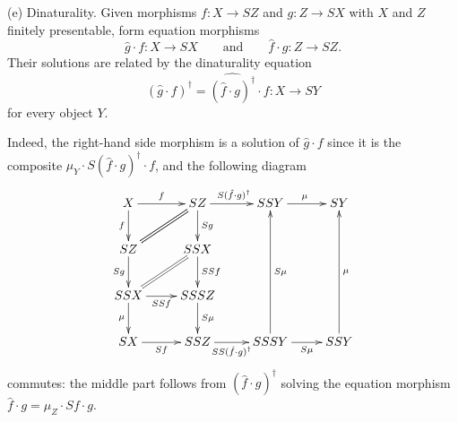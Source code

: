\documentclass{LMCS}
\theoremstyle{plain}
\theoremstyle{definition}
\numberwithin{equation}{section}
\begin{document}
\begin{exa}
\begin{enumerate}[label=\({\alph*}]
(e) Dinaturality.
Given morphisms $f:X\to SZ$ and $g:Z\to SX$ with $X$ and $Z$ finitely presentable, 
form equation morphisms
$$\hat g\cdot f:X\to SX\qquad\text{and}\qquad\hat f\cdot g:Z\to SZ.$$
Their solutions are related by the dinaturality equation
$$(\hat g\cdot f)^\dag=\widehat{(\hat f\cdot g)^\dag}\cdot f:X\to SY$$
for every object $Y$.

Indeed, the right-hand side morphism is a solution of $\hat g\cdot f$ since it is the composite $\mu_Y\cdot S(\hat f\cdot g )^\dag\cdot f$, and the following diagram
$$\xymatrix{
X\ar[r]^-f\ar[d]_-f&SZ\ar[r]^{S(\hat f\cdot g )^\dag}\ar@{=}[dl]\ar[d]^-{Sg}&SSY\ar[r]^\mu&SY\\
SZ\ar[d]_-{Sg}\ar@{=}[ur]&SSX\ar[d]^-{SSf}\\
SSX\ar[d]_-{\mu}\ar[r]_-{SSf}\ar@{=}[ur]&SSSZ\ar[d]^-{S\mu}\\
SX\ar[r]_-{Sf}&SSZ\ar[r]_-{SS(\hat f\cdot g )^\dag}&SSSY\ar[r]_-{S\mu}\ar[uuu]_-{S\mu}&SSY\ar[uuu]_-\mu
}$$
commutes: the middle part follows from $(\hat f\cdot g )^\dag$ solving the equation morphism $\hat f\cdot g=\mu_Z\cdot Sf\cdot g$.


\end{enumerate}
\end{exa}
\end{document}

